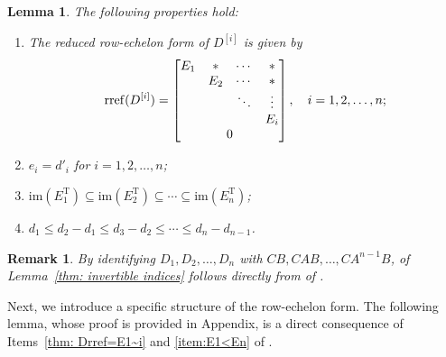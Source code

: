 \documentclass[sort&compress]{elsarticle}
\newtheorem{lemma}{Lemma}
\newtheorem{remark}{Remark}
\newcommand\rref{\mathrm{rref}}
\newcommand\im{\mathrm{im}}
\newcommand\T{\mathrm T}
\begin{document}
\begin{lemma}\label{thm: ei=d'i}
The following properties hold:
\begin{enumerate}
\item \label{thm: Drref=E1~i}
The reduced row-echelon form of $D^{[i]}$ is given by
\begin{equation}\label{eqn: Dirref=E1~i}
\rref(D^{[i]})=
\begin{bmatrix}
E_1&*&\cdots&*\\
&E_2&\cdots&*\\
&&\ddots&\vdots\\
&&&E_i\\
\multicolumn{4}{c}{0}
\end{bmatrix},
\quad i=1,2,\dots,n;
\end{equation}
\item \label{item:ei=d'i}
$e_i = d'_i$ for $i=1,2,\dots,n$;
\item \label{item:E1<En}
$\im(E_1^\T) \subseteq \im(E_2^\T) \subseteq \cdots \subseteq \im(E_n^\T)$;
\item \label{item:d1<dn-dn-1}
$d_1 \le d_2 - d_1 \le d_3 - d_2 \le \cdots \le d_n - d_{n-1}$.
\end{enumerate}
\end{lemma}

\begin{remark}
By identifying $D_1, D_2, \dots, D_n$ with $CB, CAB, \dots, CA^{n-1}B$,
 of Lemma~\ref{thm: invertible indices} follows
directly from  of .
\end{remark}

Next, we introduce a specific structure of the row-echelon form.
The following lemma, whose proof is provided in Appendix,
is a direct consequence of Items~\ref{thm: Drref=E1~i} and \ref{item:E1<En} of .
\end{document}
